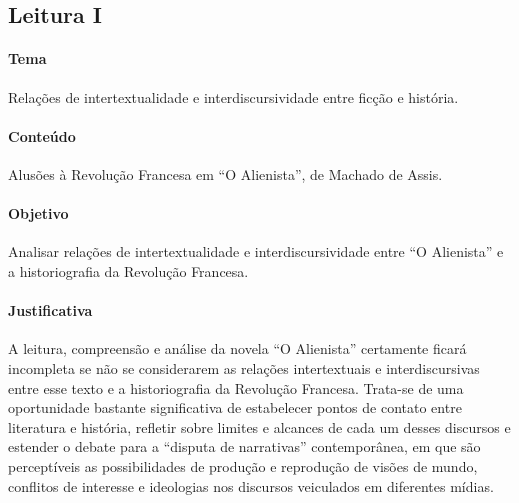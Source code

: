 \documentclass{extarticle}
\begin{document}
\subsection{Leitura I}


\paragraph{Tema} Relações de intertextualidade e interdiscursividade entre
ficção e história.

\paragraph{Conteúdo} Alusões à Revolução Francesa em ``O Alienista'', de
Machado de Assis.

\paragraph{Objetivo} Analisar relações de intertextualidade e
interdiscursividade entre ``O Alienista'' e a historiografia da
Revolução Francesa.

\paragraph{Justificativa} A leitura, compreensão e análise da novela ``O
Alienista'' certamente ficará incompleta se não se considerarem as
relações intertextuais e interdiscursivas entre esse texto e a
historiografia da Revolução Francesa. Trata-se de uma oportunidade
bastante significativa de estabelecer pontos de contato entre literatura
e história, refletir sobre limites e alcances de cada um desses
discursos e estender o debate para a ``disputa de narrativas''
contemporânea, em que são perceptíveis as possibilidades de produção e
reprodução de visões de mundo, conflitos de interesse e ideologias nos
discursos veiculados em diferentes mídias.
\end{document}
